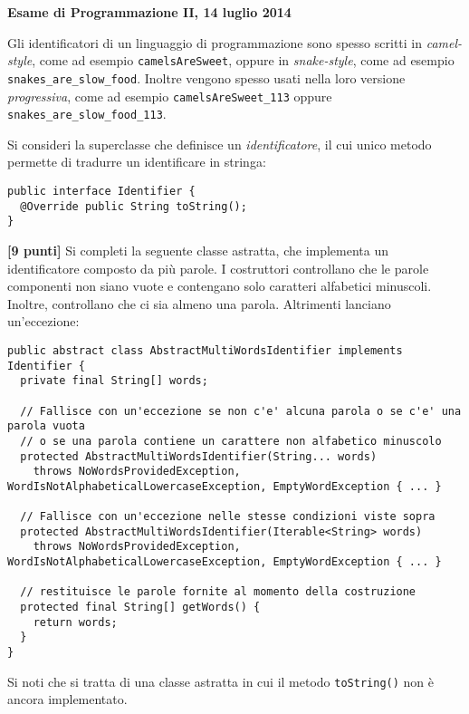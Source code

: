 \documentclass{article}[10pt]
\newcounter{esnu}
\newenvironment{esercizio}{\medskip \noindent {\bf Esercizio\addtocounter{esnu}{1} \arabic{esnu}}}{}
\begin{document}
\begin{center} {\bf Esame di Programmazione II, 14 luglio 2014}\end{center}

Gli identificatori di un linguaggio di programmazione sono spesso scritti
in \emph{camel-style}, come ad esempio \texttt{camelsAreSweet}, oppure in
\emph{snake-style}, come ad esempio \texttt{snakes\_are\_slow\_food}. Inoltre vengono
spesso usati nella loro versione \emph{progressiva}, come ad esempio
\texttt{camelsAreSweet\_113} oppure \texttt{snakes\_are\_slow\_food\_113}.

Si consideri la superclasse che definisce un \emph{identificatore}, il cui unico metodo
permette di tradurre un identificare in stringa:

{\small\begin{verbatim}
public interface Identifier {
  @Override public String toString();
}
\end{verbatim}}

\begin{esercizio}
\textbf{[9 punti]}
%
Si completi la seguente classe astratta, che implementa un identificatore composto da pi\`u parole.
I costruttori controllano che le parole componenti non siano vuote e contengano solo
caratteri alfabetici minuscoli. Inoltre, controllano che ci sia almeno una parola. Altrimenti
lanciano un'eccezione:

{\small
\begin{verbatim}
public abstract class AbstractMultiWordsIdentifier implements Identifier {
  private final String[] words;

  // Fallisce con un'eccezione se non c'e' alcuna parola o se c'e' una parola vuota
  // o se una parola contiene un carattere non alfabetico minuscolo
  protected AbstractMultiWordsIdentifier(String... words)
    throws NoWordsProvidedException, WordIsNotAlphabeticalLowercaseException, EmptyWordException { ... }

  // Fallisce con un'eccezione nelle stesse condizioni viste sopra
  protected AbstractMultiWordsIdentifier(Iterable<String> words)
    throws NoWordsProvidedException, WordIsNotAlphabeticalLowercaseException, EmptyWordException { ... }

  // restituisce le parole fornite al momento della costruzione
  protected final String[] getWords() {
    return words;
  }
}
\end{verbatim}}

\noindent
Si noti che si tratta di una classe astratta in cui il metodo \texttt{toString()} non \`e
ancora implementato.
\end{esercizio}
\end{document}
